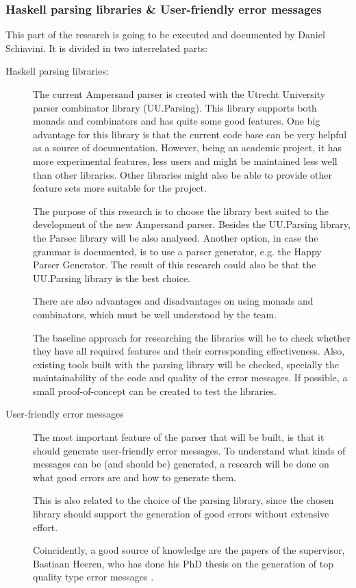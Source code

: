 \subsubsection{Haskell parsing libraries \& User-friendly error messages}
This part of the research is going to be executed and documented by Daniel Schiavini.
It is divided in two interrelated parts:
\begin{description}
	\item [Haskell parsing libraries:]
	The current Ampersand parser is created with the Utrecht University parser combinator library (UU.Parsing).
	This library supports both monads and combinators and has quite some good features.
	One big advantage for this library is that the current code base can be very helpful as a source of documentation.
	However, being an academic project, it has more experimental features, less users and might be maintained less well than other libraries.
	Other libraries might also be able to provide other feature sets more suitable for the project.
	
	The purpose of this research is to choose the library best suited to the development of the new Ampersand parser.
	Besides the UU.Parsing library, the Parsec library will be also analysed.
	Another option, in case the grammar is documented, is to use a parser generator, e.g. the Happy Parser Generator.
	The result of this research could also be that the UU.Parsing library is the best choice.
	
	There are also advantages and disadvantages on using monads and combinators, which must be well understood by the team.

	The baseline approach for researching the libraries will be to check whether they have all required features and their corresponding effectiveness.
	Also, existing tools built with the parsing library will be checked, specially the maintainability of the code and quality of the error messages.
	If possible, a small proof-of-concept can be created to test the libraries.

	\item [User-friendly error messages]
	The most important feature of the parser that will be built, is that it should generate user-friendly error messages.
	To understand what kinds of messages can be (and should be) generated, a research will be done on what good errors are and how to generate them.
	
	This is also related to the choice of the parsing library, since the chosen library should support the generation of good errors without extensive effort.
	
	Coincidently, a good source of knowledge are the papers of the supervisor, Bastiaan Heeren, who has done his PhD thesis on the generation of top quality type error messages \cite{heeren-error}.
\end{description}

